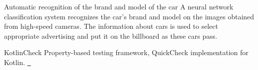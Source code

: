 

\begin{cventries}

  \cventry
    {} %
    {Automatic recognition of the brand and model of the car} %
    {} %
    {} %
    {
      A neural network classification system recognizes the car's brand and model on the images obtained from high-speed cameras. The information about cars is used to select appropriate advertising and put it on the billboard as these cars pass. \href{https://www.technologyreview.com/2017/03/02/5370/moscow-billboard-targets-ads-based-on-the-car-youre-driving/}{\faLink}
    }

  \cventry
    {} %
    {KotlinCheck} %
    {} %
    {} %
    {
      Property-based testing framework, QuickCheck implementation for Kotlin. \href{https://github.com/mchernyavsky/kotlincheck}{\ \faGithub}
    }

\end{cventries}
